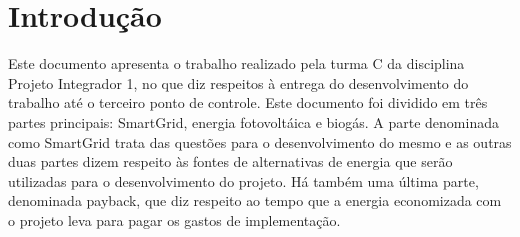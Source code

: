 \chapter*[Introdução]{Introdução}
Este documento apresenta o trabalho realizado pela turma C da disciplina Projeto Integrador 1, no que diz respeitos à entrega do desenvolvimento do trabalho até o terceiro ponto de controle. Este documento foi dividido em três partes principais: SmartGrid, energia fotovoltáica e biogás. A parte denominada como SmartGrid trata das questões para o desenvolvimento do mesmo e as outras duas partes dizem respeito às fontes de alternativas de energia que serão utilizadas para o desenvolvimento do projeto. Há também uma última parte, denominada payback, que diz respeito ao tempo que a energia economizada com o projeto leva para pagar os gastos de implementação.